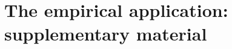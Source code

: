 \documentclass[
  12pt]{article}
\newcommand{\1}[1]{\mathds{1}\left[#1\right]}
\theoremstyle{plain}
\theoremstyle{definition}
\theoremstyle{definition}
\theoremstyle{remark}
\begin{document}
%
%
\clearpage

\section*{The empirical application: supplementary material}
\end{document}
